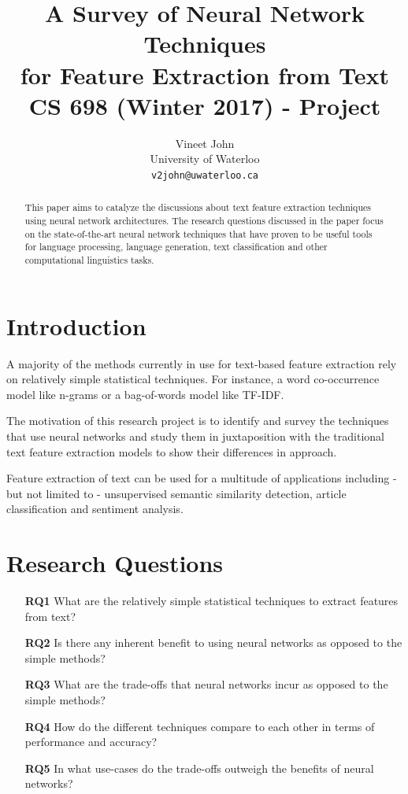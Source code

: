\documentclass[11pt,a4paper]{article}
\title{A Survey of Neural Network Techniques\\ for Feature Extraction from Text\\ \large CS 698 (Winter 2017) - Project}
\author{
  Vineet John \\
  University of Waterloo \\
  {\tt v2john@uwaterloo.ca} \\
}
\date{}
\begin{document}
\maketitle


\begin{abstract}
  This paper aims to catalyze the discussions about text feature extraction techniques using neural network architectures.
  The research questions discussed in the paper focus on the state-of-the-art neural network techniques that have proven to be useful tools for language processing, language generation, text classification and other computational linguistics tasks.
\end{abstract}


\section{Introduction} %
\label{sec:introduction}

  A majority of the methods currently in use for text-based feature extraction rely on relatively simple statistical techniques. For instance, a word co-occurrence model like n-grams or a bag-of-words model like TF-IDF.

  The motivation of this research project is to identify and survey the techniques that use neural networks and study them in juxtaposition with the traditional text feature extraction models to show their differences in approach.

  Feature extraction of text can be used for a multitude of applications including - but not limited to - unsupervised semantic similarity detection, article classification and sentiment analysis.


\section{Research Questions} %
\label{sec:research_questions}

  \begin{itemize}
    \item [\textbf{RQ1}]
    What are the relatively simple statistical techniques to extract features from text?
    \item [\textbf{RQ2}]
    Is there any inherent benefit to using neural networks as opposed to the simple methods?
    \item [\textbf{RQ3}]
    What are the trade-offs that neural networks incur as opposed to the simple methods?
    \item [\textbf{RQ4}]
    How do the different techniques compare to each other in terms of performance and accuracy?
    \item [\textbf{RQ5}]
    In what use-cases do the trade-offs outweigh the benefits of neural networks?
  \end{itemize}
\end{document}
